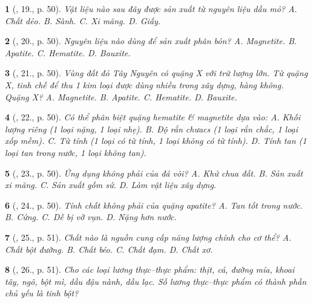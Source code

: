 \documentclass{article}
\newtheorem{baitoan}{}
\begin{document}
\begin{baitoan}[\cite{ncpt_KHTN_6_tap_1}, 19., p. 50]
	Vật liệu nào sau đây được sản xuất từ nguyên liệu dầu mỏ? {\sf A.} Chất dẻo. {\sf B.} Sành. {\sf C.} Xi măng. {\sf D.} Giấy.
\end{baitoan}

\begin{baitoan}[\cite{ncpt_KHTN_6_tap_1}, 20., p. 50]
	Nguyên liệu nào dùng để sản xuất phân bón? {\sf A.} Magnetite. {\sf B.} Apatite. {\sf C.} Hematite. {\sf D.} Bauxite.
\end{baitoan}

\begin{baitoan}[\cite{ncpt_KHTN_6_tap_1}, 21., p. 50]
	Vùng đất đỏ Tây Nguyên có quặng X với trữ lượng lớn. Từ quặng X, tinh chế để thu 1 kim loại được dùng nhiều trong xây dựng, hàng không. Quặng X? {\sf A.} Magnetite. {\sf B.} Apatite. {\sf C.} Hematite. {\sf D.} Bauxite.
\end{baitoan}

\begin{baitoan}[\cite{ncpt_KHTN_6_tap_1}, 22., p. 50]
	Có thể phân biệt quặng hematite \& magnetite dựa vào: {\sf A.} Khối lượng riêng (1 loại nặng, 1 loại nhẹ). {\sf B.} Độ rắn chưacs (1 loại rắn chắc, 1 loại xốp mềm). {\sf C.} Từ tính (1 loại có từ tính, 1 loại không có từ tính). {\sf D.} Tính tan (1 loại tan trong nước, 1 loại không tan).
\end{baitoan}

\begin{baitoan}[\cite{ncpt_KHTN_6_tap_1}, 23., p. 50]
	Ứng dụng không phải của đá vôi? {\sf A.} Khử chua đất. {\sf B.} Sản xuất xi măng. {\sf C.} Sản xuất gốm sứ. {\sf D.} Làm vật liệu xây dựng.
\end{baitoan}

\begin{baitoan}[\cite{ncpt_KHTN_6_tap_1}, 24., p. 50]
	Tính chất không phải của quặng apatite? {\sf A.} Tan tốt trong nước. {\sf B.} Cứng. {\sf C.} Dễ bị vỡ vụn. {\sf D.} Nặng hơn nước.
\end{baitoan}

\begin{baitoan}[\cite{ncpt_KHTN_6_tap_1}, 25., p. 51]
	Chất nào là nguồn cung cấp năng lượng chính cho cơ thể? {\sf A.} Chất bột đường. {\sf B.} Chất béo. {\sf C.} Chất đạm. {\sf D.} Chất xơ.
\end{baitoan}

\begin{baitoan}[\cite{ncpt_KHTN_6_tap_1}, 26., p. 51]
	Cho các loại lương thực--thực phẩm: thịt, cá, đường mía, khoai tây, ngô, bột mì, dầu đậu nành, dầu lạc. Số lương thực--thực phẩm có thành phần chủ yếu là tinh bột?
\end{baitoan}
\end{document}
